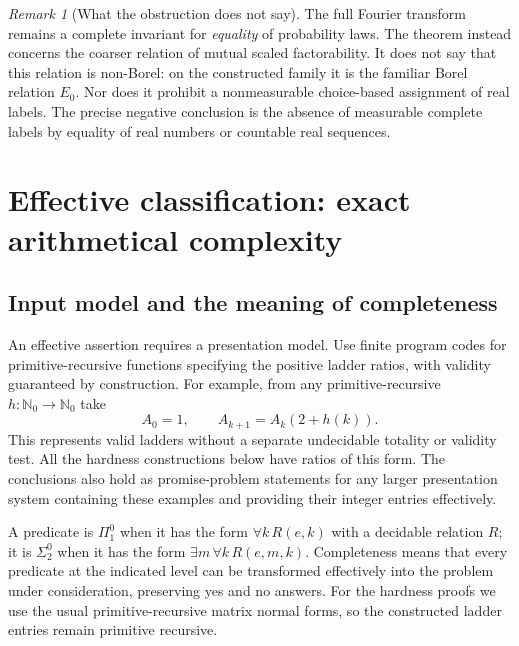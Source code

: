 \documentclass[11pt,a4paper]{article}
\theoremstyle{definition}
\theoremstyle{remark}
\newtheorem{remark}[theorem]{Remark}
\newcommand{\N}{\mathbb N}
\begin{document}
\begin{remark}[What the obstruction does not say]
The full Fourier transform remains a complete invariant for \emph{equality}
of probability laws. The theorem instead concerns the coarser relation
of mutual scaled factorability. It does not say that this relation is
non-Borel: on the constructed family it is the familiar Borel relation
$E_0$. Nor does it prohibit a nonmeasurable choice-based assignment of real
labels. The precise negative conclusion is the absence of measurable
complete labels by equality of real numbers or countable real sequences.
\end{remark}

\section{Effective classification: exact arithmetical complexity}
\label{sec:computability}

\subsection{Input model and the meaning of completeness}
An effective assertion requires a presentation model. Use finite program
codes for primitive-recursive functions specifying the positive ladder
ratios, with validity guaranteed by construction. For example, from any
primitive-recursive $h:\N_0\to\N_0$ take
\[
 A_0=1,\qquad A_{k+1}=A_k(2+h(k)).
\]
This represents valid ladders without a separate undecidable totality or
validity test. All the hardness constructions below have ratios of this
form. The conclusions also hold as promise-problem statements for any
larger presentation system containing these examples and providing their
integer entries effectively.

A predicate is $\Pi^0_1$ when it has the form $\forall k\,R(e,k)$ with
a decidable relation $R$; it is $\Sigma^0_2$ when it has the form
$\exists m\,\forall k\,R(e,m,k)$. Completeness means that every predicate
at the indicated level can be transformed effectively into the problem
under consideration, preserving yes and no answers. For the hardness
proofs we use the usual primitive-recursive matrix normal forms, so the
constructed ladder entries remain primitive recursive.
\end{document}

